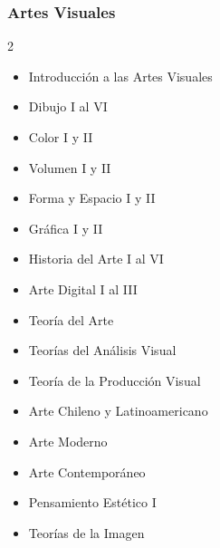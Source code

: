 \documentclass[12pt,a4paper]{article}
\begin{document}
	\subsubsection{Artes Visuales}
	\begin{multicols}{2}
		\begin{itemize}
			\item Introducción a las Artes Visuales
			\item Dibujo I al VI
			\item Color I y II
			\item Volumen I y II
			\item Forma y Espacio I y II
			\item Gráfica I y II
			\item Historia del Arte I al VI
			\item Arte Digital I al III
			\item Teoría del Arte
			\item Teorías del Análisis Visual
			\item Teoría de la Producción Visual
			\item Arte Chileno y Latinoamericano
			\item Arte Moderno
			\item Arte Contemporáneo
			\item Pensamiento Estético I
			\item Teorías de la Imagen
		\end{itemize}
	\end{multicols}
	
\end{document}
